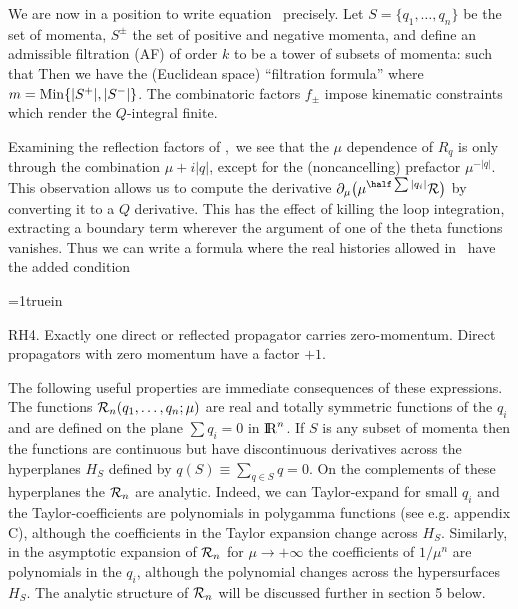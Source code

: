 We are now in a position to write equation \radmis\ precisely.
Let $S=\{q_1,\dots,q_n\}$ be the set of momenta, 
$S^{\pm}$ the set of
positive and negative momenta, and define an admissible
filtration (AF) of order $k$ to be a tower of subsets of momenta:
\eqn{}
such that
\eqn{}
Then we have the (Euclidean space) ``filtration formula''
\eqn{}
where $m = {\rm Min} \{|S^+|,|S^-|\}$.
The combinatoric factors $f_{\pm}$ impose kinematic constraints
which render the $Q$-integral finite.
 
Examining the reflection factors of \gamhf ,\gmfrm\ we see that the $\mu$
dependence of $R_q$ is only through the combination $\mu + i|q|$, 
except for the
(noncancelling) prefactor $\mu^{-|q|}$. 
This observation allows us to compute the derivative 
$\p_{\mu} \big(\mu^{\half\sum|q_i|}\CR\big)$ by converting it to a $Q$
derivative. This has the effect of killing
the loop integration, extracting a boundary term wherever 
the argument of one of the theta functions vanishes. Thus we can
write a formula 
\eqn{}
where the real histories allowed in \radmisi\ have the added condition
 
{\parindent=1truein
 
\item{RH4.} Exactly one direct or reflected propagator carries 
zero-momentum. Direct propagators with zero momentum have a factor $+1$.
 
}
 
The following useful properties
are immediate consequences of these expressions.
The functions ${\cal R}_n(q_1,\dots,q_n;\mu)$ are real and 
totally symmetric functions of the $q_i$ and are 
defined on the
plane $\sum q_i=0$ in $\relax{\rm I\kern-.18em R}^n$. If $S$ is any subset of 
momenta then the functions are continuous but have discontinuous
derivatives across the 
hyperplanes $H_S$ defined by $q(S)\equiv \sum_{q\in S} q=0$. 
On the complements of these hyperplanes the ${\cal R}_n$ are analytic.
Indeed, we can Taylor-expand for small $q_i$ and 
the Taylor-coefficients are polynomials in 
polygamma functions (see e.g. appendix C), although the 
coefficients in the Taylor expansion change across $H_S$. 
Similarly, in the asymptotic expansion of ${\cal R}_n$ for 
$\mu\to +\infty$ the coefficients
of $1/\mu^n$ are polynomials in the $q_i$, although the 
polynomial changes across the hypersurfaces $H_S$. 
The analytic structure of ${\cal R}_n$ will be discussed 
further in section 5 below.
 

